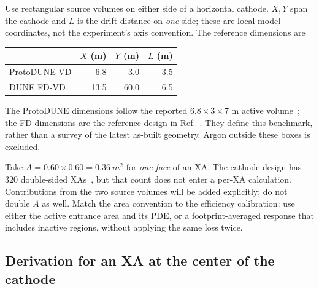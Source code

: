 \documentclass[11pt]{article}
\begin{document}
Use rectangular source volumes on either side of a horizontal cathode.
$X,Y$ span the cathode and $L$ is the drift distance on \emph{one} side;
these are local model coordinates, not the experiment's axis convention.
The reference dimensions are
\begin{center}
\begin{tabular}{lrrr}
\toprule
 & $X$ (m) & $Y$ (m) & $L$ (m) \\
\midrule
ProtoDUNE-VD & 6.8 & 3.0 & 3.5 \\
DUNE FD-VD & 13.5 & 60.0 & 6.5 \\
\bottomrule
\end{tabular}
\end{center}
The ProtoDUNE dimensions follow the reported $6.8\times3\times7$ m active
volume~\cite{pdvd_geometry}; the FD dimensions are the reference design
in Ref.~\cite{fdvd_geometry}. They define this benchmark, rather than a
survey of the latest as-built geometry. Argon outside these boxes is excluded.

Take $A=0.60\times0.60=\SI{0.36}{m^2}$ for \emph{one face} of an XA.
The cathode design has 320 double-sided XAs~\cite{fdvd_pde}, but that count
does not enter a per-XA calculation. Contributions from the two source
volumes will be added explicitly; do not double $A$ as well. Match the area
convention to the efficiency calibration: use either the active entrance
area and its PDE, or a footprint-averaged response that includes inactive
regions, without applying the same loss twice.

\subsection{Derivation for an XA at the center of the cathode}
\end{document}
